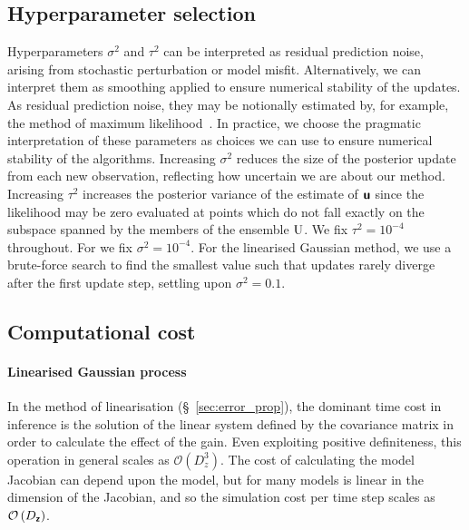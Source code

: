 \documentclass{article}
\theoremstyle{plain}
\theoremstyle{definition}
\theoremstyle{remark}
\begin{document}
\subsection{Hyperparameter selection}\label{sec:HyperparamSelection}
Hyperparameters \(\sigma^2\) and \(\tau^2\) can be interpreted as residual prediction noise, arising from stochastic perturbation or model misfit.
Alternatively, we can interpret them as smoothing applied to ensure numerical stability of the updates.
As residual prediction noise, they may be notionally estimated by, for example, the method of maximum likelihood~\citep{MitchellAdaptive2000}.
In practice, we choose the pragmatic interpretation of these parameters as choices we can use to ensure numerical stability of the algorithms.
Increasing \(\sigma^2\) reduces the size of the posterior update from each new observation, reflecting how uncertain we are about our method.
Increasing \(\tau^2\) increases the posterior variance of the estimate of \(\boldsymbol{\mathsf{u}}\) since the likelihood may be zero evaluated at points which do not fall exactly on the subspace spanned by the members of the ensemble \(\mathrm{U}\).
We fix \(\tau^2=10^{-4}\) throughout.
For \meth{} we fix \(\sigma^2=10^{-4}\).
For the linearised Gaussian method, we use a brute-force search to find the smallest value such that updates rarely diverge after the first update step, settling upon \(\sigma^2=0.1\).

\subsection{Computational cost}
\label{sec:computational_cost}
\paragraph{Linearised Gaussian process} In the method of linearisation (\S~\ref{sec:error_prop}), the dominant time cost in inference is the solution of the linear system defined by the covariance matrix in order to calculate the effect of the gain.
Even exploiting positive definiteness, this operation in general scales as \(\mathcal{O}\left(D_{z}^3\right)\).
The cost of calculating the model Jacobian can depend upon the model, but for many models is linear in the dimension of the Jacobian, and so the simulation cost per time step scales as \(\mathcal{O}\left(D_{\boldsymbol{\mathsf{z}}}\right)\).
\end{document}
